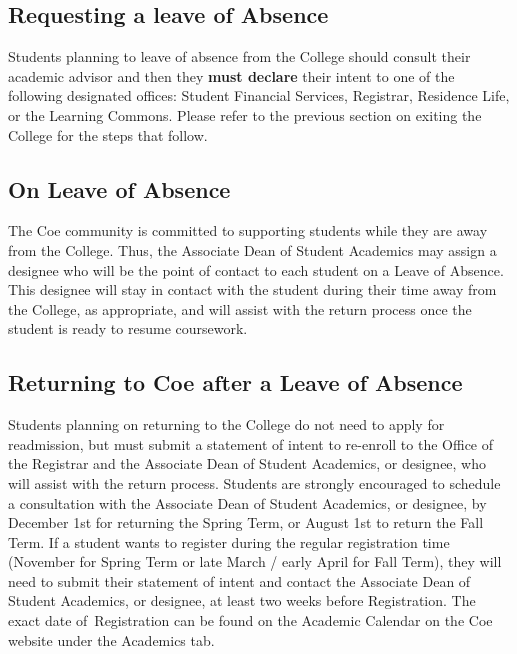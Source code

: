 \documentclass[
  letterpaper,
]{scrbook}
\begin{document}
\subsection{Requesting a leave of
Absence}\label{requesting-a-leave-of-absence}

Students planning to leave of absence from the College should consult
their academic advisor and then they \textbf{must declare} their intent
to one of the following designated offices: Student Financial Services,
Registrar, Residence Life, or the Learning Commons. Please refer to the
previous section on exiting the College for the steps that follow.~

\subsection{On Leave of Absence}\label{on-leave-of-absence}

The Coe community is committed to supporting students while they are
away from the College. Thus, the Associate Dean of Student Academics may
assign a designee who will be the point of contact to each student on a
Leave of Absence. This designee will stay in contact with the student
during their time away from the College, as appropriate, and will assist
with the return process once the student is ready to resume coursework.~

\subsection{Returning to Coe after a Leave of
Absence}\label{returning-to-coe-after-a-leave-of-absence}

Students planning on returning to the College do not need to apply for
readmission, but must submit a statement of intent to re-enroll to the
Office of the Registrar and the Associate Dean of Student Academics, or
designee, who will assist with the return process. Students are strongly
encouraged to schedule a consultation with the Associate Dean of Student
Academics, or designee, by December 1st for returning the Spring Term,
or August 1st to return the Fall Term. If a student wants to register
during the regular registration time (November for Spring Term or late
March / early April for Fall Term), they will need to submit their
statement of intent and contact the Associate Dean of Student Academics,
or designee, at least two weeks before Registration. The exact date
of~Registration can be found on the Academic Calendar on the Coe website
under the Academics tab.~
\end{document}
